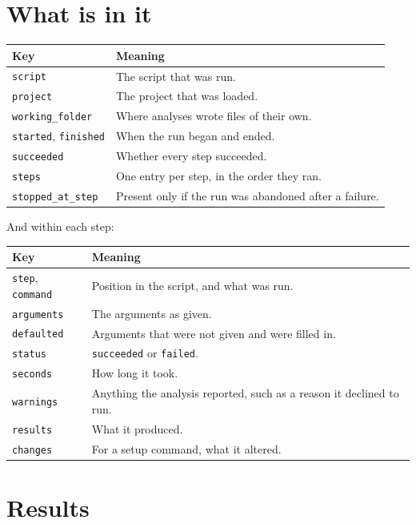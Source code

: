 \documentclass[11pt,a4paper]{report}
\begin{document}
\section{What is in it}

\begin{longtable}{@{}p{}p{}@{}}
\toprule
\textbf{Key} & \textbf{Meaning} \\
\midrule
\endfirsthead
\texttt{script} & The script that was run. \\
\texttt{project} & The project that was loaded. \\
\texttt{working\_folder} & Where analyses wrote files of their own. \\
\texttt{started}, \texttt{finished} & When the run began and ended. \\
\texttt{succeeded} & Whether every step succeeded. \\
\texttt{steps} & One entry per step, in the order they ran. \\
\texttt{stopped\_at\_step} & Present only if the run was abandoned after a
  failure. \\
\bottomrule
\end{longtable}

And within each step:

\begin{longtable}{@{}p{}p{}@{}}
\toprule
\textbf{Key} & \textbf{Meaning} \\
\midrule
\endfirsthead
\texttt{step}, \texttt{command} & Position in the script, and what was run. \\
\texttt{arguments} & The arguments as given. \\
\texttt{defaulted} & Arguments that were not given and were filled in. \\
\texttt{status} & \texttt{succeeded} or \texttt{failed}. \\
\texttt{seconds} & How long it took. \\
\texttt{warnings} & Anything the analysis reported, such as a reason it
  declined to run. \\
\texttt{results} & What it produced. \\
\texttt{changes} & For a setup command, what it altered. \\
\bottomrule
\end{longtable}

\section{Results}
\end{document}
